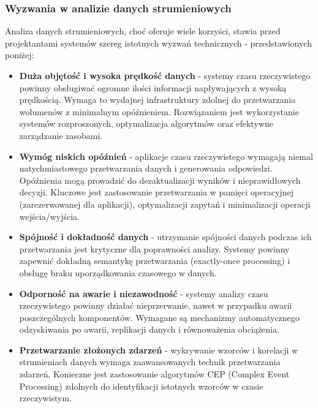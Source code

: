 \subsubsection{Wyzwania w analizie danych strumieniowych}
\label{subsubsec:wyzwania_analizy_rt}

Analiza danych strumieniowych, choć oferuje wiele korzyści, stawia przed projektantami systemów szereg istotnych wyzwań technicznych - przedstawionych poniżej:

\begin{itemize}
    \item \textbf{Duża objętość i wysoka prędkość danych} - systemy czasu rzeczywistego powinny obsługiwać ogromne ilości informacji napływających z wysoką prędkością. Wymaga to wydajnej infrastruktury zdolnej do przetwarzania wolumenów z minimalnym opóźnieniem. Rozwiązaniem jest wykorzystanie systemów rozproszonych, optymalizacja algorytmów oraz efektywne zarządzanie zasobami.
    
    \item \textbf{Wymóg niskich opóźnień} - aplikacje czasu rzeczywistego wymagają niemal natychmiastowego przetwarzania danych i generowania odpowiedzi. Opóźnienia mogą prowadzić do dezaktualizacji wyników i nieprawidłowych decyzji. Kluczowe jest zastosowanie przetwarzania w pamięci operacyjnej (zarezerwowanej dla aplikacji), optymalizacji zapytań i minimalizacji operacji wejścia/wyjścia.
    
    \item \textbf{Spójność i dokładność danych} - utrzymanie spójności danych podczas ich przetwarzania jest krytyczne dla poprawności analizy. Systemy powinny zapewnić dokładną semantykę przetwarzania (exactly-once processing) i obsługę braku uporządkowania czasowego w danych.
    
    \item \textbf{Odporność na awarie i niezawodność} - systemy analizy czasu rzeczywistego powinny działać nieprzerwanie, nawet w przypadku awarii poszczególnych komponentów. Wymagane są mechanizmy automatycznego odzyskiwania po awarii, replikacji danych i równoważenia obciążenia.
    
    \item \textbf{Przetwarzanie złożonych zdarzeń} - wykrywanie wzorców i korelacji w strumieniach danych wymaga zaawansowanych technik przetwarzania zdarzeń. Konieczne jest zastosowanie algorytmów CEP (Complex Event Processing) zdolnych do identyfikacji istotnych wzorców w czasie rzeczywistym.
    

\end{itemize}
